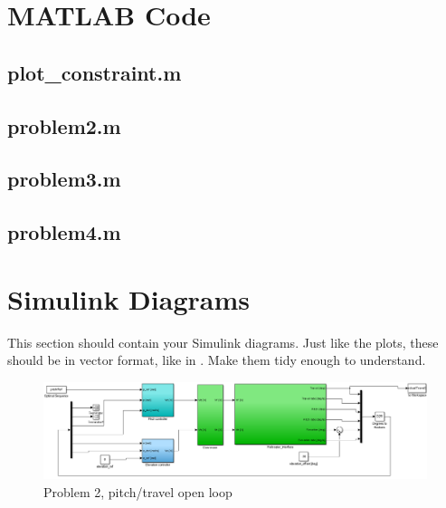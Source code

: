 \appendix

\section{MATLAB Code}\label{sec:matlab}
\subsection{plot\_constraint.m}\label{sec:plot_constraint_m}


\subsection{problem2.m}\label{sec:problem2_m}


\subsection{problem3.m}\label{sec:problem3_m}




\subsection{problem4.m}\label{sec:problem4_m}








\section{Simulink Diagrams}\label{sec:simulink}
This section should contain your Simulink diagrams. Just like the plots, these should be in vector format, like in . Make them tidy enough to understand.


\begin{figure}[htb]
	\centering
		\includegraphics[width = \textwidth]{figures/simulink/oppgave2.PNG}
	\caption{Problem 2, pitch/travel open loop}
\label{fig:problem2}
\end{figure}

